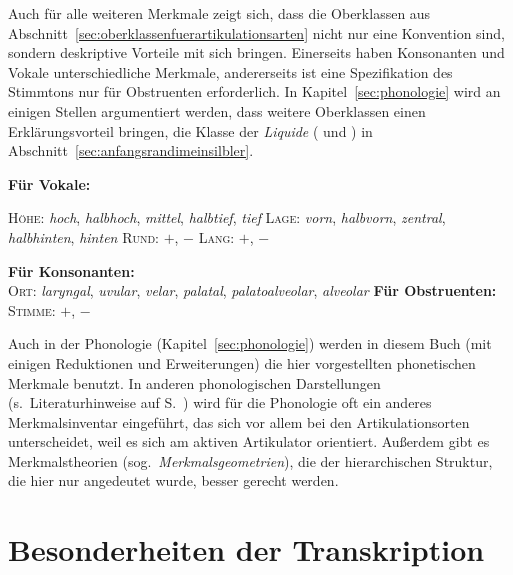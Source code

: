 Auch für alle weiteren Merkmale zeigt sich, dass die Oberklassen aus Abschnitt~\ref{sec:oberklassenfuerartikulationsarten} nicht nur eine Konvention sind, sondern deskriptive Vorteile mit sich bringen.
Einerseits haben Konsonanten und Vokale unterschiedliche Merkmale, andererseits ist eine Spezifikation des Stimmtons nur für Obstruenten erforderlich.
In Kapitel~\ref{sec:phonologie} wird an einigen Stellen argumentiert werden, dass weitere Oberklassen einen Erklärungsvorteil bringen, \zB die Klasse der \textit{Liquide} (\textipa{[K]} und \textipa{[l]}) in Abschnitt~\ref{sec:anfangsrandimeinsilbler}.

\begin{exe}
	\ex \textbf{Für Vokale:}
		\begin{xlist}
			\ex \textsc{Höhe}: \textit{hoch}, \textit{halbhoch}, \textit{mittel}, \textit{halbtief}, \textit{tief}
			\ex \textsc{Lage}: \textit{vorn}, \textit{halbvorn}, \textit{zentral}, \textit{halbhinten}, \textit{hinten}
			\ex \textsc{Rund}: $+$, $-$
			\ex \textsc{Lang}: $+$, $-$
		\end{xlist}
	\ex \textbf{Für Konsonanten:}\\
			\textsc{Ort}: \textit{laryngal}, \textit{uvular}, \textit{velar}, \textit{palatal}, \textit{palatoalveolar}, \textit{alveolar}
	\ex \textbf{Für Obstruenten:}\\
		\textsc{Stimme}: $+$, $-$
\end{exe}

Auch in der Phonologie (Kapitel~\ref{sec:phonologie}) werden in diesem Buch (mit einigen Reduktionen und Erweiterungen) die hier vorgestellten phonetischen Merkmale benutzt.
In anderen phonologischen Darstellungen (s.\ Literaturhinweise auf S.~\pageref{abs:pholliteratur}) wird für die Phonologie oft ein anderes Merkmalsinventar eingeführt, das sich vor allem bei den Artikulationsorten unterscheidet, weil es sich am aktiven Artikulator orientiert.
Außerdem gibt es Merkmalstheorien (sog.\ \textit{Merkmalsgeometrien}), die der hierarchischen Struktur, die hier nur angedeutet wurde, besser gerecht werden.




\section{Besonderheiten der Transkription}


